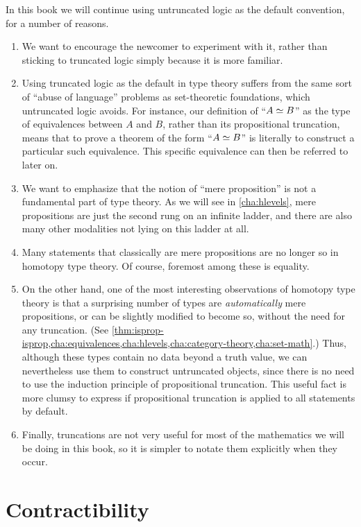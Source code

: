 In this book we will continue using untruncated logic as the default convention, for a number of reasons.
\begin{enumerate}[label=(\arabic*)]
\item We want to encourage the newcomer to experiment with it, rather than sticking to truncated logic simply because it is more familiar.
\item Using truncated logic as the default in type theory suffers from the same sort of ``abuse of language'' problems as set-theoretic foundations, which untruncated logic avoids.
  For instance, our definition of ``$A \simeq B$'' as the type of equivalences between $A$ and $B$, rather than its propositional truncation, means that to prove a theorem of the form ``$A \simeq B$'' is literally to construct a particular such equivalence.
  This specific equivalence can then be referred to later on.
\item We want to emphasize that the notion of ``mere proposition'' is not a fundamental part of type theory.
  As we will see in \autoref{cha:hlevels}, mere propositions are just the second rung on an infinite ladder, and there are also many other modalities not lying on this ladder at all.
\item Many statements that classically are mere propositions are no longer so in homotopy type theory.
  Of course, foremost among these is equality.
\item On the other hand, one of the most interesting observations of homotopy type theory is that a surprising number of types are \emph{automatically} mere propositions, or can be slightly modified to become so, without the need for any truncation.
  (See \autoref{thm:isprop-isprop,cha:equivalences,cha:hlevels,cha:category-theory,cha:set-math}.)
  Thus, although these types contain no data beyond a truth value, we can nevertheless use them to construct untruncated objects, since there is no need to use the induction principle of propositional truncation.
  This useful fact is more clumsy to express if propositional truncation is applied to all statements by default.
\item Finally, truncations are not very useful for most of the mathematics we will be doing in this book, so it is simpler to notate them explicitly when they occur.
\end{enumerate}

\section{Contractibility}
\label{sec:contractibility}

